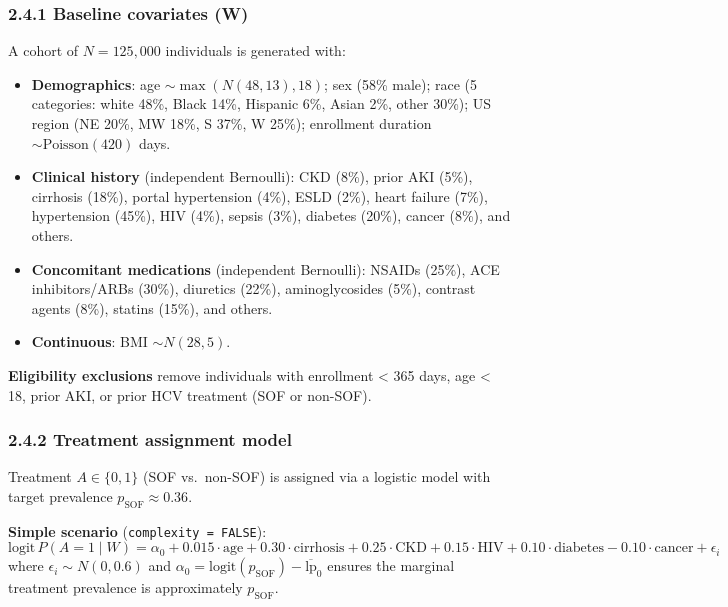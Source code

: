 \documentclass[
  letterpaper,
  DIV=11,
  numbers=noendperiod]{scrartcl}
\providecommand{\tightlist}{%
  \setlength{\itemsep}{0pt}\setlength{\parskip}{0pt}}\usepackage{longtable,booktabs,array}
\begin{document}
\subsubsection{2.4.1 Baseline covariates
(W)}\label{baseline-covariates-w}

A cohort of \(N = 125{,}000\) individuals is generated with:

\begin{itemize}
\tightlist
\item
  \textbf{Demographics}: age \(\sim \max(N(48, 13), 18)\); sex (58\%
  male); race (5 categories: white 48\%, Black 14\%, Hispanic 6\%, Asian
  2\%, other 30\%); US region (NE 20\%, MW 18\%, S 37\%, W 25\%);
  enrollment duration \(\sim \text{Poisson}(420)\) days.
\item
  \textbf{Clinical history} (independent Bernoulli): CKD (8\%), prior
  AKI (5\%), cirrhosis (18\%), portal hypertension (4\%), ESLD (2\%),
  heart failure (7\%), hypertension (45\%), HIV (4\%), sepsis (3\%),
  diabetes (20\%), cancer (8\%), and others.
\item
  \textbf{Concomitant medications} (independent Bernoulli): NSAIDs
  (25\%), ACE inhibitors/ARBs (30\%), diuretics (22\%), aminoglycosides
  (5\%), contrast agents (8\%), statins (15\%), and others.
\item
  \textbf{Continuous}: BMI \(\sim N(28, 5)\).
\end{itemize}

\textbf{Eligibility exclusions} remove individuals with enrollment
\textless{} 365 days, age \textless{} 18, prior AKI, or prior HCV
treatment (SOF or non-SOF).

\subsubsection{2.4.2 Treatment assignment
model}\label{treatment-assignment-model}

Treatment \(A \in \{0, 1\}\) (SOF vs.~non-SOF) is assigned via a
logistic model with target prevalence \(p_{\text{SOF}} \approx 0.36\).

\textbf{Simple scenario} (\texttt{complexity\ =\ FALSE}):
\[\text{logit}\, P(A = 1 \mid W) = \alpha_0 + 0.015 \cdot \text{age} + 0.30 \cdot \text{cirrhosis} + 0.25 \cdot \text{CKD} + 0.15 \cdot \text{HIV} + 0.10 \cdot \text{diabetes} - 0.10 \cdot \text{cancer} + \epsilon_i\]
where \(\epsilon_i \sim N(0, 0.6)\) and
\(\alpha_0 = \text{logit}(p_{\text{SOF}}) - \overline{\text{lp}}_0\)
ensures the marginal treatment prevalence is approximately
\(p_{\text{SOF}}\).
\end{document}
